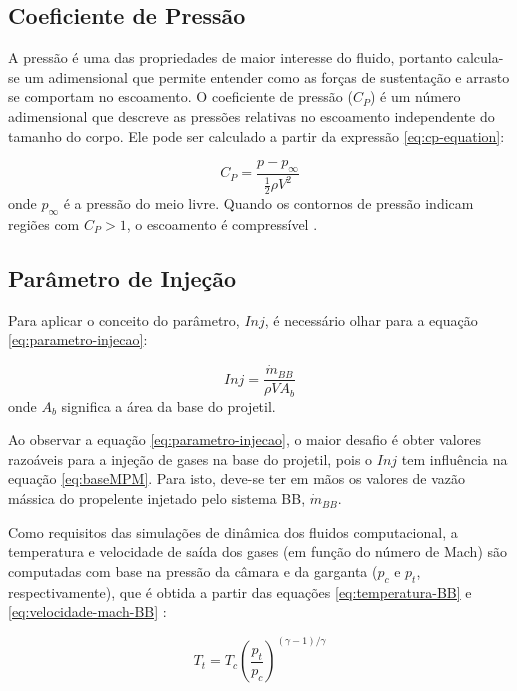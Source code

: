 \subsection{Coeficiente de Pressão}

A pressão é uma das propriedades de maior interesse do fluido, portanto calcula-se um adimensional que permite entender como as forças de sustentação e arrasto se comportam no escoamento. O coeficiente de pressão ($C_{P}$) é um número adimensional que descreve as pressões relativas no escoamento independente do tamanho do corpo. Ele pode ser calculado a partir da expressão \eqref{eq:cp-equation}: 

\begin{equation}\label{eq:cp-equation}
    C_P = \frac{p - p_{\infty}}{\frac{1}{2}\rho V^2}
\end{equation}
%
onde $p_{\infty}$ é a pressão do meio livre. Quando os contornos de pressão indicam regiões com $C_{P} > 1$, o escoamento é compressível \cite{anderson_modern_2002}.

\subsection{Parâmetro de Injeção}

Para aplicar o conceito do parâmetro, $Inj$, é necessário olhar para a equação \ref{eq:parametro-injecao}:

\begin{equation}\label{eq:parametro-injecao}
    Inj = \frac{\Dot{m}_{BB}}{\rho VA_{b}}
\end{equation}
%
onde $A_{b}$ significa a área da base do projetil. 

Ao observar a equação \ref{eq:parametro-injecao}, o maior desafio é obter valores razoáveis para a injeção de gases na base do projetil, pois o $Inj$ tem influência na equação \ref{eq:baseMPM}. Para isto, deve-se ter em mãos os valores de vazão mássica do propelente injetado pelo sistema BB, $\Dot{m}_{BB}$. 

Como requisitos das simulações de dinâmica dos fluidos computacional, a temperatura e velocidade de saída dos gases (em função do número de Mach) são computadas com base na pressão da câmara e da garganta (\(p_{c}\) e \(p_{t}\), respectivamente), que é obtida a partir das equações \ref{eq:temperatura-BB} e \ref{eq:velocidade-mach-BB} \cite{Gil2020}:

\begin{equation}
    \label{eq:temperatura-BB}
    T_{t} = T_{c}\left(\frac{p_t}{p_c}\right)^{(\gamma - 1)/\gamma}
\end{equation}

